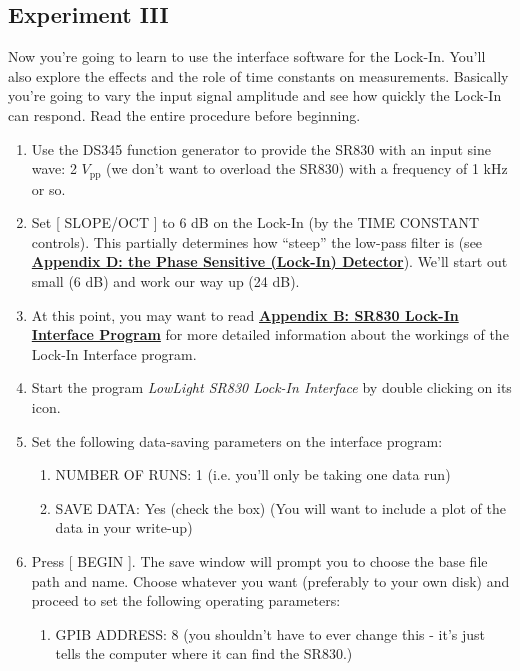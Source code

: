 \documentclass{../lab}
\begin{document}
\subsection{Experiment III}

Now you're going to learn to use the interface software for the Lock-In. You'll also explore the effects and the role of time constants on measurements. Basically you're going to vary the input signal amplitude and see how quickly the Lock-In can respond. Read the entire procedure before beginning.

\begin{enumerate}
    \item Use the DS345 function generator to provide the SR830 with an input sine wave: 2 $V_\text{pp}$ (we don't want to overload the SR830) with a frequency of 1 kHz or so.

    \item Set [ SLOPE/OCT ] to 6 dB on the Lock-In (by the TIME CONSTANT controls). This partially determines how ``steep'' the low-pass filter is (see \href{https://berkeley-physics111b.github.io/appendices/LLS-Appendix-D-the-Phase-Sensitive-Lock-In-Detector/}{\textbf{Appendix D: the Phase Sensitive (Lock-In) Detector}}). We'll start out small (6 dB) and work our way up (24 dB).

    \item At this point, you may want to read \href{https://berkeley-physics111b.github.io/appendices/LLS-Appendix-B-SR830-Lock-In-Interface-Program/}{\textbf{Appendix B: SR830 Lock-In Interface Program}} for more detailed information about the workings of the Lock-In Interface program.

    \item Start the program \emph{LowLight SR830 Lock-In Interface} by double clicking on its icon.

    \item Set the following data-saving parameters on the interface program:
    \begin{enumerate}
        \item NUMBER OF RUNS: 1 (i.e. you'll only be taking one data run)

        \item SAVE DATA: Yes (check the box) (You will want to include a plot of the data in your write-up)

    \end{enumerate}

    \item Press [ BEGIN ]. The save window will prompt you to choose the base file path and name. Choose whatever you want (preferably to your own disk) and proceed to set the following operating parameters:
    \begin{enumerate}
        \item GPIB ADDRESS: 8 (you shouldn't have to ever change this - it's just tells the computer where it can find the SR830.)


\end{enumerate}
\end{enumerate}
\end{document}
